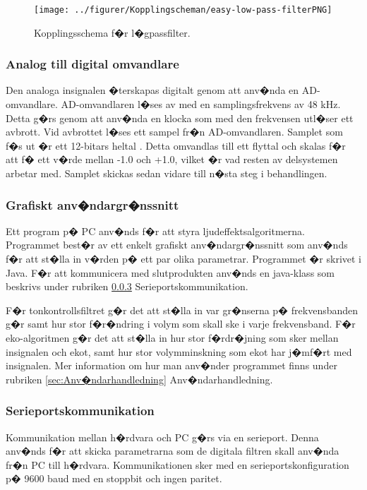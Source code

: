 \documentclass[a4paper]{article}
\begin{document}
\begin{figure}[h!]
  \centering
  \texttt{[image: ../figurer/Kopplingscheman/easy-low-pass-filterPNG]}
  \caption{Kopplingsschema f�r l�gpassfilter.}
  \label{fig:lowpass}
\end{figure}

\subsubsection{Analog till digital omvandlare}

Den analoga insignalen �terskapas digitalt genom att anv�nda en AD-omvandlare.
AD-omvandlaren l�ses av med en samplingsfrekvens av 48 kHz. Detta g�rs genom att
anv�nda en klocka som med den frekvensen utl�ser ett avbrott. Vid avbrottet l�ses
ett sampel fr�n AD-omvandlaren. Samplet som f�s ut �r ett 12-bitars
heltal \cite{stmdata}. Detta omvandlas till ett flyttal och skalas
f�r att f� ett v�rde mellan -1.0 och +1.0, vilket �r vad resten av delsystemen
arbetar med. Samplet skickas sedan vidare till n�sta steg i behandlingen.

\newpage
\subsubsection{Grafiskt anv�ndargr�nssnitt}

Ett program p� PC anv�nds f�r att styra ljudeffektsalgoritmerna. Programmet
best�r av ett enkelt grafiskt anv�ndargr�nssnitt som anv�nds f�r att st�lla in
v�rden p� ett par olika parametrar. Programmet �r skrivet i Java. F�r att
kommunicera med slutprodukten anv�nds en java-klass som beskrivs under
rubriken \ref{sec:Serieportskommunikation} Serieportskommunikation.

F�r tonkontrollsfiltret g�r det att st�lla in var gr�nserna p� frekvensbanden
g�r samt hur stor f�r�ndring i volym som skall ske i varje frekvensband. F�r
eko-algoritmen g�r det att st�lla in hur stor f�rdr�jning som sker mellan
insignalen och ekot, samt hur stor volymminskning som ekot har j�mf�rt med
insignalen. Mer information om hur man anv�nder programmet finns under
rubriken \ref{sec:Anv�ndarhandledning} Anv�ndarhandledning.

\subsubsection{Serieportskommunikation}
\label{sec:Serieportskommunikation}

Kommunikation mellan h�rdvara och PC g�rs via en serieport. Denna anv�nds f�r att 
skicka parametrarna som de digitala filtren skall anv�nda fr�n PC till h�rdvara.
Kommunikationen sker med en serieportskonfiguration p� 9600 baud med en
stoppbit och ingen paritet.
\end{document}
